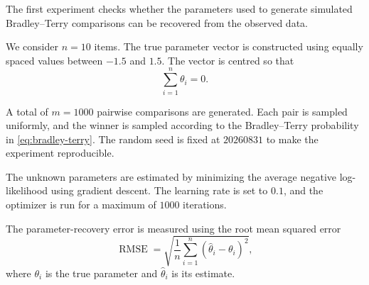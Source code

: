 \documentclass[11pt,a4paper]{article}
\begin{document}
The first experiment checks whether the parameters used to generate
simulated Bradley--Terry comparisons can be recovered from the observed
data.

We consider \(n=10\) items. The true parameter vector is constructed
using equally spaced values between \(-1.5\) and \(1.5\). The vector is
centred so that
\begin{equation}
    \sum_{i=1}^{n}\theta_i=0.
\end{equation}

A total of \(m=1000\) pairwise comparisons are generated. Each pair is
sampled uniformly, and the winner is sampled according to the
Bradley--Terry probability in \cref{eq:bradley-terry}. The random seed is
fixed at \(20260831\) to make the experiment reproducible.

The unknown parameters are estimated by minimizing the average negative
log-likelihood using gradient descent. The learning rate is set to
\(0.1\), and the optimizer is run for a maximum of \(1000\) iterations.

The parameter-recovery error is measured using the root mean squared
error
\begin{equation}
    \operatorname{RMSE}
    =
    \sqrt{
        \frac{1}{n}
        \sum_{i=1}^{n}
        \left(
            \widehat{\theta}_i-\theta_i
        \right)^2
    },
    \label{eq:btl-recovery-rmse}
\end{equation}
where \(\theta_i\) is the true parameter and
\(\widehat{\theta}_i\) is its estimate.
\end{document}
